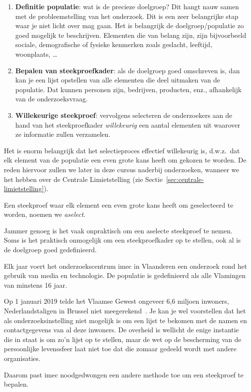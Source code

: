 \begin{enumerate}
  \item \textbf{Definitie populatie}: wat is de precieze doelgroep? Dit hangt nauw samen met de probleemstelling van het onderzoek. Dit is een zeer belangrijke stap waar je niet licht over mag gaan. Het is belangrijk de doelgroep/populatie zo goed mogelijk te beschrijven. Elementen die van belang zijn, zijn bijvoorbeeld sociale, demografische of fysieke kenmerken zoals geslacht, leeftijd, woonplaats, \dots
  \item \textbf{Bepalen van steekproefkader}: als de doelgroep goed omschreven is, dan kan je een lijst opstellen van alle elementen die deel uitmaken van de populatie. Dat kunnen personen zijn, bedrijven, producten, enz., afhankelijk van de onderzoeksvraag.
  \item \textbf{Willekeurige steekproef}: vervolgens selecteren de onderzoekers aan de hand van het steekproefkader \textit{willekeurig} een aantal elementen uit waarover ze informatie zullen verzamelen.
\end{enumerate}

Het is enorm belangrijk dat het selectieproces effectief willekeurig is, d.w.z.~dat elk element van de populatie een even grote kans heeft om gekozen te worden. De reden hiervoor zullen we later in deze cursus naderbij onderzoeken, wanneer we het hebben over de Centrale Limietstelling (zie Sectie~\ref{sec:centrale-limietstelling}).

\begin{definition}
  Een steekproef waar elk element een even grote kans heeft om geselecteerd te worden, noemen we \emph{aselect}.
\end{definition}

Jammer genoeg is het vaak onpraktisch om een aselecte steekproef te nemen. Soms is het praktisch onmogelijk om een steekproefkader op te stellen, ook al is de doelgroep goed gedefinieerd.

\begin{example}
  Elk jaar voert het onderzoekscentrum imec in Vlaanderen een onderzoek rond het gebruik van media en technologie. De populatie is gedefinieerd als alle Vlamingen van minstens 16 jaar.
  
  Op 1 januari 2019 telde het Vlaamse Gewest ongeveer 6,6 miljoen inwoners, Nederlandstaligen in Brussel niet meegerekend~\autocite{Statbel2019}. Je kan je wel voorstellen dat het als onderzoeksinstelling niet mogelijk is om een lijst te bekomen met de namen en contactgegevens van al deze inwoners. De overheid is wellicht de enige instantie die in staat is om zo'n lijst op te stellen, maar de wet op de bescherming van de persoonlijke levenssfeer laat niet toe dat die zomaar gedeeld wordt met andere organisaties.
  
  Daarom past imec noodgedwongen een andere methode toe om een steekproef te bepalen.
\end{example}


